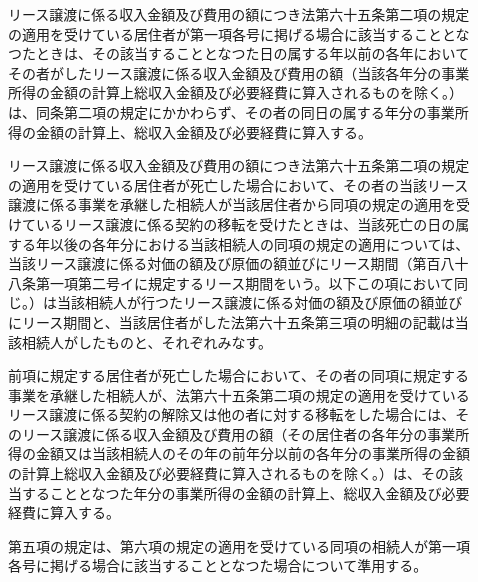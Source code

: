 \documentclass[twocolumn,a4j,10pt]{ltjtarticle}
\begin{document}
\begin{description}
\item[]リース譲渡に係る収入金額及び費用の額につき法第六十五条第二項の規定の適用を受けている居住者が第一項各号に掲げる場合に該当することとなつたときは、その該当することとなつた日の属する年以前の各年においてその者がしたリース譲渡に係る収入金額及び費用の額（当該各年分の事業所得の金額の計算上総収入金額及び必要経費に算入されるものを除く。）は、同条第二項の規定にかかわらず、その者の同日の属する年分の事業所得の金額の計算上、総収入金額及び必要経費に算入する。
\item[]リース譲渡に係る収入金額及び費用の額につき法第六十五条第二項の規定の適用を受けている居住者が死亡した場合において、その者の当該リース譲渡に係る事業を承継した相続人が当該居住者から同項の規定の適用を受けているリース譲渡に係る契約の移転を受けたときは、当該死亡の日の属する年以後の各年分における当該相続人の同項の規定の適用については、当該リース譲渡に係る対価の額及び原価の額並びにリース期間（第百八十八条第一項第二号イに規定するリース期間をいう。以下この項において同じ。）は当該相続人が行つたリース譲渡に係る対価の額及び原価の額並びにリース期間と、当該居住者がした法第六十五条第三項の明細の記載は当該相続人がしたものと、それぞれみなす。
\item[]前項に規定する居住者が死亡した場合において、その者の同項に規定する事業を承継した相続人が、法第六十五条第二項の規定の適用を受けているリース譲渡に係る契約の解除又は他の者に対する移転をした場合には、そのリース譲渡に係る収入金額及び費用の額（その居住者の各年分の事業所得の金額又は当該相続人のその年の前年分以前の各年分の事業所得の金額の計算上総収入金額及び必要経費に算入されるものを除く。）は、その該当することとなつた年分の事業所得の金額の計算上、総収入金額及び必要経費に算入する。
\item[]第五項の規定は、第六項の規定の適用を受けている同項の相続人が第一項各号に掲げる場合に該当することとなつた場合について準用する。
\end{description}
\end{document}
